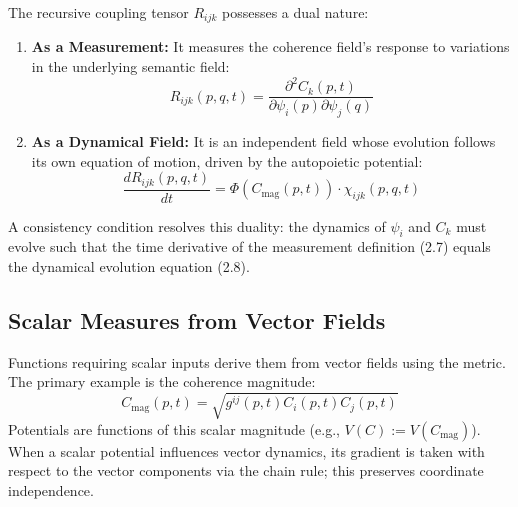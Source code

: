 The recursive coupling tensor \(R_{ijk}\) possesses a dual nature:
\begin{enumerate}
    \item \textbf{As a Measurement:} It measures the coherence field's response to variations in the underlying semantic field:
    \begin{equation}
    R_{ijk}(p, q, t) = \frac{\partial^2 C_k(p,t)}{\partial \psi_i(p) \partial \psi_j(q)}
    \end{equation}
    \item \textbf{As a Dynamical Field:} It is an independent field whose evolution follows its own equation of motion, driven by the autopoietic potential:
    \begin{equation}
    \frac{dR_{ijk}(p,q,t)}{dt} = \Phi(C_{\mathrm{mag}}(p,t)) \cdot \chi_{ijk}(p,q,t)
    \end{equation}
\end{enumerate}
A consistency condition resolves this duality: the dynamics of \(\psi_i\) and \(C_k\) must evolve such that the time derivative of the measurement definition (2.7) equals the dynamical evolution equation (2.8).

\subsection{Scalar Measures from Vector Fields}

Functions requiring scalar inputs derive them from vector fields using the metric. The primary example is the coherence magnitude:
\begin{equation}
C_{\mathrm{mag}}(p,t) = \sqrt{g^{ij}(p,t) C_i(p,t) C_j(p,t)}
\end{equation}
Potentials are functions of this scalar magnitude (e.g., \(V(C) := V(C_{\mathrm{mag}})\)). When a scalar potential influences vector dynamics, its gradient is taken with respect to the vector components via the chain rule; this preserves coordinate independence. 